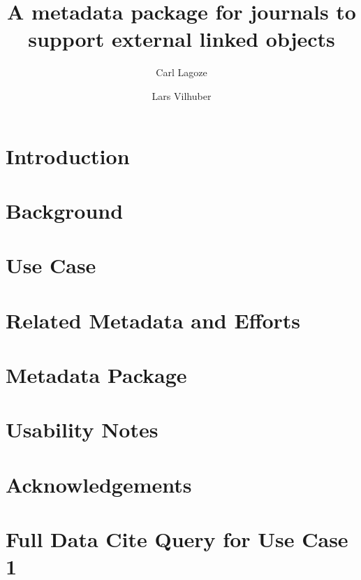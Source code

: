 \documentclass[research,19]{idcc}
\author{Carl Lagoze}
\affil{University of Michigan}
\author{Lars Vilhuber}
\affil{Cornell University}
\title{A metadata package for journals to support external linked objects}
\begin{document}
\maketitle

\begin{abstract}
	
\end{abstract}

\section{Introduction}
\label{sec:intro}


\section{Background}
\label{sec:background}


\section{Use Case}
\label{sec:usecase}


\section{Related Metadata and Efforts}
\label{sec:related-metadata}


\section{Metadata Package}
\label{sec:metadata-package}


\section{Usability Notes}
\label{sec:usability}


\section{Acknowledgements}
\label{sec:ack}



%
%
\printbibliography


\appendix

\section{Full Data Cite Query for Use Case 1}
\label{app:case1}

\end{document}
